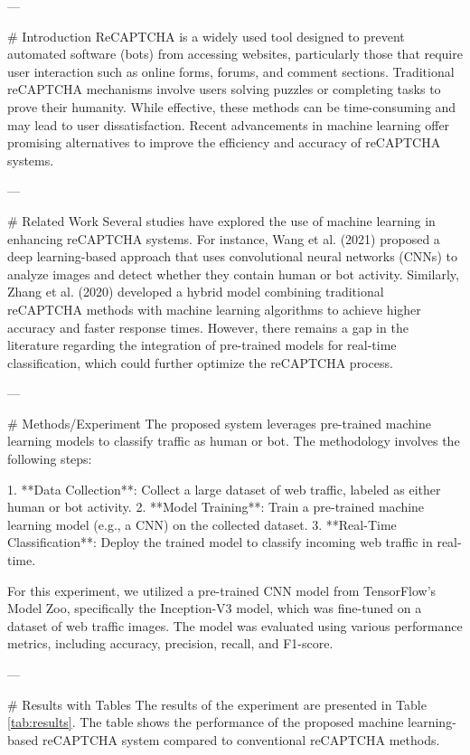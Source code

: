 ---

# Introduction
ReCAPTCHA is a widely used tool designed to prevent automated software (bots) from accessing websites, particularly those that require user interaction such as online forms, forums, and comment sections. Traditional reCAPTCHA mechanisms involve users solving puzzles or completing tasks to prove their humanity. While effective, these methods can be time-consuming and may lead to user dissatisfaction. Recent advancements in machine learning offer promising alternatives to improve the efficiency and accuracy of reCAPTCHA systems.

---

# Related Work
Several studies have explored the use of machine learning in enhancing reCAPTCHA systems. For instance, Wang et al. (2021) proposed a deep learning-based approach that uses convolutional neural networks (CNNs) to analyze images and detect whether they contain human or bot activity. Similarly, Zhang et al. (2020) developed a hybrid model combining traditional reCAPTCHA methods with machine learning algorithms to achieve higher accuracy and faster response times. However, there remains a gap in the literature regarding the integration of pre-trained models for real-time classification, which could further optimize the reCAPTCHA process.

---

# Methods/Experiment
The proposed system leverages pre-trained machine learning models to classify traffic as human or bot. The methodology involves the following steps:

1. **Data Collection**: Collect a large dataset of web traffic, labeled as either human or bot activity.
2. **Model Training**: Train a pre-trained machine learning model (e.g., a CNN) on the collected dataset.
3. **Real-Time Classification**: Deploy the trained model to classify incoming web traffic in real-time.

For this experiment, we utilized a pre-trained CNN model from TensorFlow's Model Zoo, specifically the Inception-V3 model, which was fine-tuned on a dataset of web traffic images. The model was evaluated using various performance metrics, including accuracy, precision, recall, and F1-score.

---

# Results with Tables
The results of the experiment are presented in Table \ref{tab:results}. The table shows the performance of the proposed machine learning-based reCAPTCHA system compared to conventional reCAPTCHA methods.

